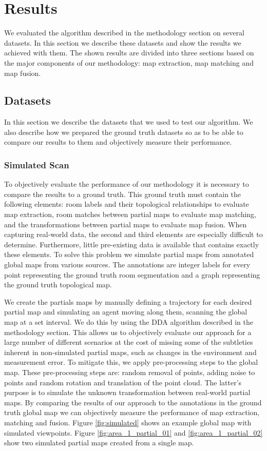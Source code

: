 \section{Results}
We evaluated the algorithm described in the methodology section on several datasets. In this section we describe these datasets and show the results we achieved with them. The shown results are divided into three sections based on the major components of our methodology: map extraction, map matching and map fusion. 

\subsection{Datasets}
In this section we describe the datasets that we used to test our algorithm. We also describe how we prepared the ground truth datasets so as to be able to compare our results to them and objectively measure their performance. 

\subsubsection{Simulated Scan}
To objectively evaluate the performance of our methodology it is necessary to compare the results to a ground truth. This ground truth must contain the following elements: room labels and their topological relationships to evaluate map extraction, room matches between partial maps to evaluate map matching, and the transformations between partial maps to evaluate map fusion. When capturing real-world data, the second and third elements are especially difficult to determine. Furthermore, little pre-existing data is available that contains exactly these elements. To solve this problem we simulate partial maps from annotated global maps from various sources. The annotations are integer labels for every point representing the ground truth room segmentation and a graph representing the ground truth topological map. 

We create the partials maps by manually defining a trajectory for each desired partial map and simulating an agent moving along them, scanning the global map at a set interval. We do this by using the DDA algorithm described in the methodology section. This allows us to objectively evaluate our approach for a large number of different scenarios at the cost of missing some of the subtleties inherent in non-simulated partial maps, such as changes in the environment and measurement error. To mitigate this, we apply pre-processing steps to the global map. These pre-processing steps are: random removal of points, adding noise to points and random rotation and translation of the point cloud. The latter's purpose is to simulate the unknown transformation between real-world partial maps. By comparing the results of our approach to the annotations in the ground truth global map we can objectively measure the performance of map extraction, matching and fusion. Figure \ref{fig:simulated} shows an example global map with simulated viewpoints. Figure \ref{fig:area_1_partial_01} and \ref{fig:area_1_partial_02} show two simulated partial maps created from a single map.

